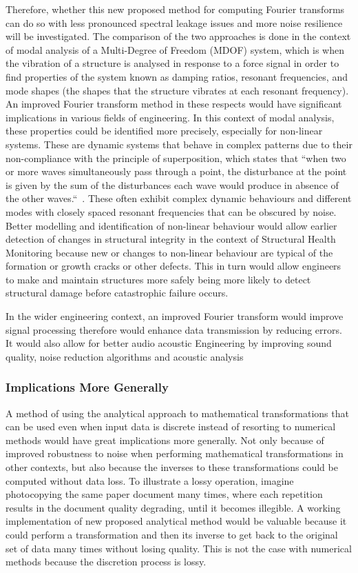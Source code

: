 \documentclass[12pt]{article}
\begin{document}
    Therefore, whether this new proposed method for computing Fourier transforms can do so with less pronounced spectral leakage issues and more noise resilience will be investigated.
    The comparison of the two approaches is done in the context of modal analysis of a Multi-Degree of Freedom (MDOF) system, which is when the vibration of a structure is analysed in response to a force signal in order to find properties of the system known as damping ratios, resonant frequencies, and mode shapes (the shapes that the structure vibrates at each resonant frequency).
    An improved Fourier transform method in these respects would have significant implications in various fields of engineering.
    In this context of modal analysis, these properties could be identified more precisely, especially for non-linear systems.
    These are dynamic systems that behave in complex patterns due to their non-compliance with the principle of superposition, which states that ``when two or more waves simultaneously pass through a point, the disturbance at the point is given by the sum of the disturbances each wave would produce in absence of the other waves.``~\cite{StudyComSuperposition}.
    These often exhibit complex dynamic behaviours and different modes with closely spaced resonant frequencies that can be obscured by noise.
    Better modelling and identification of non-linear behaviour would allow earlier detection of changes in structural integrity in the context of Structural Health Monitoring because new or changes to non-linear behaviour are typical of the formation or growth cracks or other defects.
    This in turn would allow engineers to make and maintain structures more safely being more likely to detect structural damage before catastrophic failure occurs.

    In the wider engineering context, an improved Fourier transform would improve signal processing therefore would enhance data transmission by reducing errors.
    It would also allow for better audio acoustic Engineering by improving sound quality, noise reduction algorithms and acoustic analysis

    \subsubsection{Implications More Generally}

    A method of using the analytical approach to mathematical transformations that can be used even when input data is discrete instead of resorting to numerical methods would have great implications more generally.
    Not only because of improved robustness to noise when performing mathematical transformations in other contexts, but also because  the inverses to these transformations could be computed without data loss.
    To illustrate a lossy operation, imagine photocopying the same paper document many times, where each repetition results in the document quality degrading, until it becomes illegible.
    A working implementation of new proposed analytical method would be valuable because it could perform a transformation and then its inverse to get back to the original set of data many times without losing quality.
    This is not the case with numerical methods because the discretion process is lossy.
\end{document}
